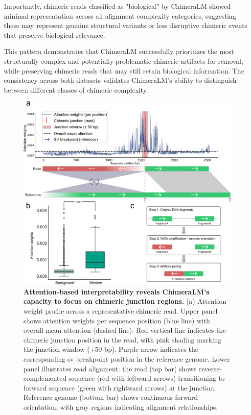\documentclass[pdflatex,sn-nature]{sn-jnl}%
\theoremstyle{thmstyleone}%
\theoremstyle{thmstyletwo}%
\theoremstyle{thmstylethree}%
\begin{document}
Importantly, chimeric reads classified as "biological" by ChimeraLM showed minimal representation across all alignment complexity categories, suggesting these may represent genuine structural variants or less disruptive chimeric events that preserve biological relevance.

This pattern demonstrates that ChimeraLM successfully prioritizes the most structurally complex and potentially problematic chimeric artifacts for removal, while preserving chimeric reads that may still retain biological information.
The consistency across both datasets validates ChimeraLM's ability to distinguish between different classes of chimeric complexity.

\begin{figure}[!ht]
	\begin{center}
		\includegraphics[width=\textwidth]{final_figures/figure4}
	\end{center}
	\caption{{\bf Attention-based interpretability reveals ChimeraLM's capacity to focus on chimeric junction regions.}
		(a) Attention weight profile across a representative chimeric read. Upper panel shows attention weights per sequence position (blue line) with overall mean attention (dashed line). Red vertical line indicates the chimeric junction position in the read, with pink shading marking the junction window ($\pm$50 bp). Purple arrow indicates the corresponding \gls{sv} breakpoint position in the reference genome. Lower panel illustrates read alignment: the read (top bar) shows reverse-complemented sequence (red with leftward arrows) transitioning to forward sequence (green with rightward arrows) at the junction. Reference genome (bottom bar) shows continuous forward orientation, with gray regions indicating alignment relationships.
}
\end{figure}
\end{document}
